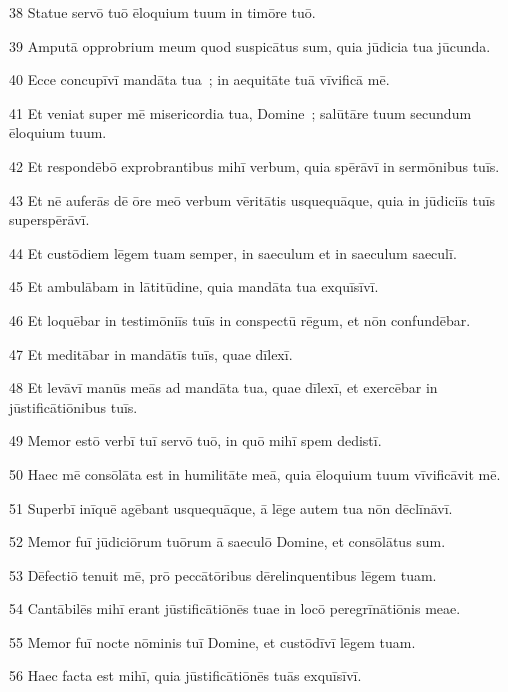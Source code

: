 \psalmVerse
  {\phantom{0}38}
  {Statue servō tuō ēloquium tuum in timōre tuō.}


\psalmVerse
  {\phantom{0}39}
  {Amputā opprobrium meum quod suspicātus sum, quia jūdicia tua jūcunda.}


\psalmVerse
  {\phantom{0}40}
  {Ecce concupīvī mandāta tua~; in aequitāte tuā vīvificā mē.}


\psalmVerse
  {\phantom{0}41}
  {Et veniat super mē misericordia tua, Domine~; salūtāre tuum secundum ēloquium tuum.}


\psalmVerse
  {\phantom{0}42}
  {Et respondēbō exprobrantibus mihī verbum, quia spērāvī in sermōnibus tuīs.}


\psalmVerse
  {\phantom{0}43}
  {Et nē auferās dē ōre meō verbum vēritātis usquequāque, quia in jūdiciīs tuīs superspērāvī.}


\psalmVerse
  {\phantom{0}44}
  {Et custōdiem lēgem tuam semper, in saeculum et in saeculum saeculī.}


\psalmVerse
  {\phantom{0}45}
  {Et ambulābam in lātitūdine, quia mandāta tua exquīsīvī.}


\psalmVerse
  {\phantom{0}46}
  {Et loquēbar in testimōniīs tuīs in conspectū rēgum, et nōn confundēbar.}


\psalmVerse
  {\phantom{0}47}
  {Et meditābar in mandātīs tuīs, quae dīlexī.}


\psalmVerse
  {\phantom{0}48}
  {Et levāvī manūs meās ad mandāta tua, quae dīlexī, et exercēbar in jūstificātiōnibus tuīs.}


\psalmVerse
  {\phantom{0}49}
  {Memor estō verbī tuī servō tuō, in quō mihī spem dedistī.}


\psalmVerse
  {\phantom{0}50}
  {Haec mē consōlāta est in humilitāte meā, quia ēloquium tuum vīvificāvit mē.}


\psalmVerse
  {\phantom{0}51}
  {Superbī inīquē agēbant usquequāque, ā lēge autem tua nōn dēclīnāvī.}


\psalmVerse
  {\phantom{0}52}
  {Memor fuī jūdiciōrum tuōrum ā saeculō Domine, et consōlātus sum.}


\psalmVerse
  {\phantom{0}53}
  {Dēfectiō tenuit mē, prō peccātōribus dērelinquentibus lēgem tuam.}


\psalmVerse
  {\phantom{0}54}
  {Cantābilēs mihī erant jūstificātiōnēs tuae in locō peregrīnātiōnis meae.}


\psalmVerse
  {\phantom{0}55}
  {Memor fuī nocte nōminis tuī Domine, et custōdīvī lēgem tuam.}


\psalmVerse
  {\phantom{0}56}
  {Haec facta est mihī, quia jūstificātiōnēs tuās exquīsīvī.}


